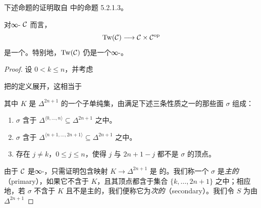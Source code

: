 下述命题的证明取自 \cite{Lur17} 中的命题 5.2.1.3。

\begin{proposition}\label{prop:twisted-arrow-right-fibration}
对∞-\trCategory{} $\mathcal{C}$ 而言，\trFunctor{}%
\[
\mathrm{Tw}(\mathcal{C}) \longrightarrow \mathcal{C} \times \mathcal{C}^{\mathrm{op}}
\]
是一个\trRightFibration{}。特别地，$\mathrm{Tw}(\mathcal{C})$ 仍是一个∞-\trCategory{}。
\end{proposition}

\begin{proof}
设 $0 < k \le n$，并考虑\trLiftingProblem{}%
\begin{center}
\end{center}
把\trTwistedArrowCategory{}的定义展开，这相当于\trLiftingProblem{}%
\begin{center}
\end{center}
其中 $K$ 是 $\Delta^{2n+1}$ 的一个子单纯集，由满足下述三条性质之一的那些面
$\sigma$ 组成：
\begin{enumerate}[label=(\arabic*)]
  \item $\sigma$ 含于
        $\Delta^{\langle 0, \dots, n\rangle} \subseteq \Delta^{2n+1}$ 之中。
  \item $\sigma$ 含于
        $\Delta^{\langle n+1, \dots, 2n+1\rangle} \subseteq \Delta^{2n+1}$ 之中。
  \item 存在 $j \ne k$，$0 \le j \le n$，使得 $j$ 与 $2n+1-j$ 都不是 $\sigma$
        的顶点。
\end{enumerate}
由于 $\mathcal{C}$ 是∞-\trCategory{}，只需证明包含映射 $K \to \Delta^{2n+1}$ 是%
\trInnerAnodyne{}的。我们称一个\trSimplex{} $\sigma$ 是\emph{主的}（primary），如果它不含于
$K$，且其顶点都含于集合 $\{k, \dots, 2n+1\}$ 之中；相应地，若 $\sigma$ 不含于 $K$
且不是主的，我们便称它为\emph{次的}（secondary）。我们令 $S$ 为由 $\Delta^{2n+1}$

\end{proof}

